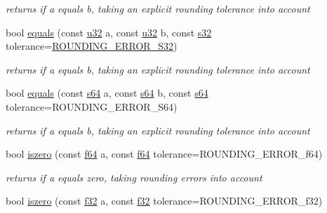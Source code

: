 \begin{DoxyCompactItemize}
\begin{DoxyCompactList}\small\item\em returns if a equals b, taking an explicit rounding tolerance into account \end{DoxyCompactList}\item 
bool \hyperlink{namespaceirr_1_1core_a9a54aa08fdc2119258ad8dfa44f8dadf}{equals} (const \hyperlink{namespaceirr_a0416a53257075833e7002efd0a18e804}{u32} a, const \hyperlink{namespaceirr_a0416a53257075833e7002efd0a18e804}{u32} b, const \hyperlink{namespaceirr_ac66849b7a6ed16e30ebede579f9b47c6}{s32} tolerance=\hyperlink{namespaceirr_1_1core_aac9f99b6a999bdf25fec402c59e8342a}{R\+O\+U\+N\+D\+I\+N\+G\+\_\+\+E\+R\+R\+O\+R\+\_\+\+S32})\hypertarget{namespaceirr_1_1core_a9a54aa08fdc2119258ad8dfa44f8dadf}{}\label{namespaceirr_1_1core_a9a54aa08fdc2119258ad8dfa44f8dadf}

\begin{DoxyCompactList}\small\item\em returns if a equals b, taking an explicit rounding tolerance into account \end{DoxyCompactList}\item 
bool \hyperlink{namespaceirr_1_1core_a7928ce8e86ff93d918b0c144efab7b47}{equals} (const \hyperlink{namespaceirr_abf54bd535f8d4dd996270e68c3ad8c08}{s64} a, const \hyperlink{namespaceirr_abf54bd535f8d4dd996270e68c3ad8c08}{s64} b, const \hyperlink{namespaceirr_abf54bd535f8d4dd996270e68c3ad8c08}{s64} tolerance=R\+O\+U\+N\+D\+I\+N\+G\+\_\+\+E\+R\+R\+O\+R\+\_\+\+S64)\hypertarget{namespaceirr_1_1core_a7928ce8e86ff93d918b0c144efab7b47}{}\label{namespaceirr_1_1core_a7928ce8e86ff93d918b0c144efab7b47}

\begin{DoxyCompactList}\small\item\em returns if a equals b, taking an explicit rounding tolerance into account \end{DoxyCompactList}\item 
bool \hyperlink{namespaceirr_1_1core_afc24e6ba26469ec7ca7001ed272dc3b2}{iszero} (const \hyperlink{namespaceirr_a1325b02603ad449f92c68fc640af9b28}{f64} a, const \hyperlink{namespaceirr_a1325b02603ad449f92c68fc640af9b28}{f64} tolerance=R\+O\+U\+N\+D\+I\+N\+G\+\_\+\+E\+R\+R\+O\+R\+\_\+f64)\hypertarget{namespaceirr_1_1core_afc24e6ba26469ec7ca7001ed272dc3b2}{}\label{namespaceirr_1_1core_afc24e6ba26469ec7ca7001ed272dc3b2}

\begin{DoxyCompactList}\small\item\em returns if a equals zero, taking rounding errors into account \end{DoxyCompactList}\item 
bool \hyperlink{namespaceirr_1_1core_aaf94a81169679083a48f9f9e6dced684}{iszero} (const \hyperlink{namespaceirr_a0277be98d67dc26ff93b1a6a1d086b07}{f32} a, const \hyperlink{namespaceirr_a0277be98d67dc26ff93b1a6a1d086b07}{f32} tolerance=R\+O\+U\+N\+D\+I\+N\+G\+\_\+\+E\+R\+R\+O\+R\+\_\+f32)\hypertarget{namespaceirr_1_1core_aaf94a81169679083a48f9f9e6dced684}{}\label{namespaceirr_1_1core_aaf94a81169679083a48f9f9e6dced684}


\end{DoxyCompactItemize}
